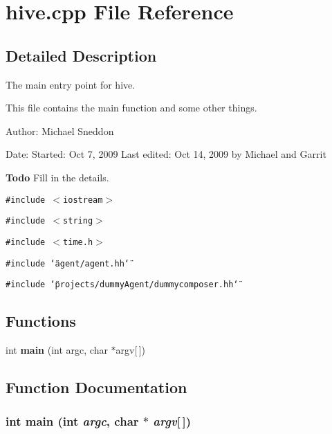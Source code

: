 \section{hive.cpp File Reference}
\label{hive_8cpp}


\subsection{Detailed Description}
The main entry point for hive. 

This file contains the main function and some other things.

\begin{Desc}
\item[Author:]Michael Sneddon \end{Desc}
\begin{Desc}
\item[Date:]Started: Oct 7, 2009 Last edited: Oct 14, 2009 by Michael and Garrit\end{Desc}
\begin{Desc}
\item[{\bf Todo}]Fill in the details.\end{Desc}


{\tt \#include $<$iostream$>$}\par
{\tt \#include $<$string$>$}\par
{\tt \#include $<$time.h$>$}\par
{\tt \#include \char`\"{}agent/agent.hh\char`\"{}}\par
{\tt \#include \char`\"{}projects/dummyAgent/dummycomposer.hh\char`\"{}}\par
\subsection*{Functions}
\begin{CompactItemize}
\item 
int {\bf main} (int argc, char $\ast$argv[$\,$])
\end{CompactItemize}


\subsection{Function Documentation}
\subsubsection[main]{\setlength{\rightskip}{0pt plus 5cm}int main (int {\em argc}, \/  char $\ast$ {\em argv}[$\,$])}\label{hive_8cpp_0ddf1224851353fc92bfbff6f499fa97}


